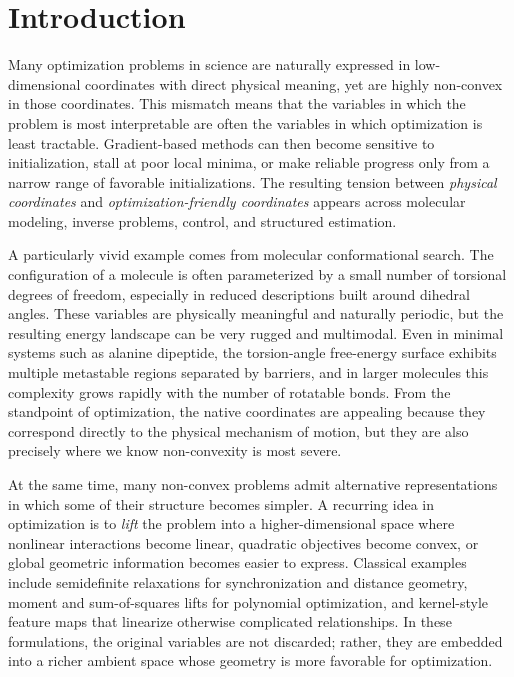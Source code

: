 \documentclass[10pt]{article}
\theoremstyle{definition}
\begin{document}

\section{Introduction}

Many optimization problems in science are naturally expressed in low-dimensional coordinates with direct physical meaning, yet are highly non-convex in those coordinates. This mismatch means that the variables in which the problem is most interpretable are often the variables in which optimization is least tractable. Gradient-based methods can then become sensitive to initialization, stall at poor local minima, or make reliable progress only from a narrow range of favorable initializations. The resulting tension between \emph{physical coordinates} and \emph{optimization-friendly coordinates} appears across molecular modeling, inverse problems, control, and structured estimation.

A particularly vivid example comes from molecular conformational search. The configuration of a molecule is often parameterized by a small number of torsional degrees of freedom, especially in reduced descriptions built around dihedral angles. These variables are physically meaningful and naturally periodic, but the resulting energy landscape can be very rugged and multimodal. Even in minimal systems such as alanine dipeptide, the torsion-angle free-energy surface exhibits multiple metastable regions separated by barriers, and in larger molecules this complexity grows rapidly with the number of rotatable bonds. From the standpoint of optimization, the native coordinates are appealing because they correspond directly to the physical mechanism of motion, but they are also precisely where we know non-convexity is most severe.

At the same time, many non-convex problems admit alternative representations in which some of their structure becomes simpler. A recurring idea in optimization is to \emph{lift} the problem into a higher-dimensional space where nonlinear interactions become linear, quadratic objectives become convex, or global geometric information becomes easier to express. Classical examples include semidefinite relaxations for synchronization and distance geometry, moment and sum-of-squares lifts for polynomial optimization, and kernel-style feature maps that linearize otherwise complicated relationships. In these formulations, the original variables are not discarded; rather, they are embedded into a richer ambient space whose geometry is more favorable for optimization.
\end{document}
